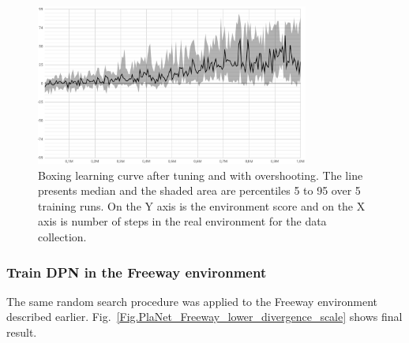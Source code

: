 \begin{figure}[H]
\includegraphics[width=0.8\textwidth,keepaspectratio]{figures/PlaNet/Boxing_with_overshooting.png}
\caption[Boxing learning curve after tuning and with overshooting]{Boxing learning curve after tuning and with overshooting. The line presents median and the shaded area are percentiles 5 to 95 over 5 training runs. On the Y axis is the environment score and on the X axis is number of steps in the real environment for the data collection.}
\label{Fig.Boxing_with_overshooting}
\end{figure}

\subsubsection{Train DPN in the Freeway environment}

The same random search procedure was applied to the Freeway environment described earlier. Fig.~\ref{Fig.PlaNet_Freeway_lower_divergence_scale} shows final result.

